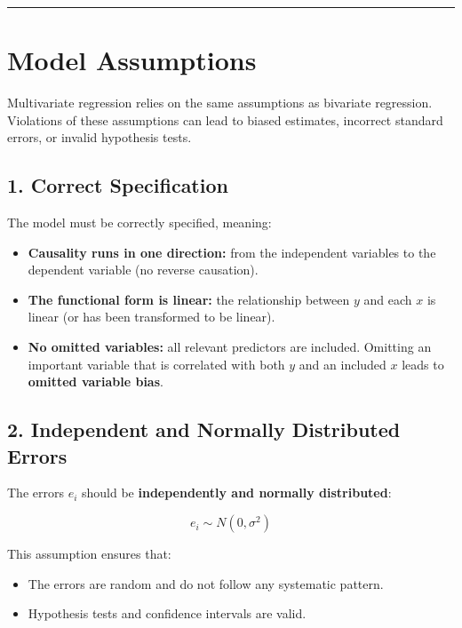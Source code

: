\documentclass[
  letterpaper,
  DIV=11,
  numbers=noendperiod]{scrreprt}
\providecommand{\tightlist}{%
  \setlength{\itemsep}{0pt}\setlength{\parskip}{0pt}}
\begin{document}
\begin{center}\rule{0.5\linewidth}{0.5pt}\end{center}

\section{Model Assumptions}\label{model-assumptions}

Multivariate regression relies on the same assumptions as bivariate
regression. Violations of these assumptions can lead to biased
estimates, incorrect standard errors, or invalid hypothesis tests.

\subsection{1. Correct Specification}\label{correct-specification}

The model must be correctly specified, meaning:

\begin{itemize}
\tightlist
\item
  \textbf{Causality runs in one direction:} from the independent
  variables to the dependent variable (no reverse causation).
\item
  \textbf{The functional form is linear:} the relationship between \(y\)
  and each \(x\) is linear (or has been transformed to be linear).
\item
  \textbf{No omitted variables:} all relevant predictors are included.
  Omitting an important variable that is correlated with both \(y\) and
  an included \(x\) leads to \textbf{omitted variable bias}.
\end{itemize}

\subsection{2. Independent and Normally Distributed
Errors}\label{independent-and-normally-distributed-errors}

The errors \(e_i\) should be \textbf{independently and normally
distributed}:

\[
e_i \sim N(0, \sigma^2)
\]

This assumption ensures that:

\begin{itemize}
\tightlist
\item
  The errors are random and do not follow any systematic pattern.
\item
  Hypothesis tests and confidence intervals are valid.
\end{itemize}
\end{document}
